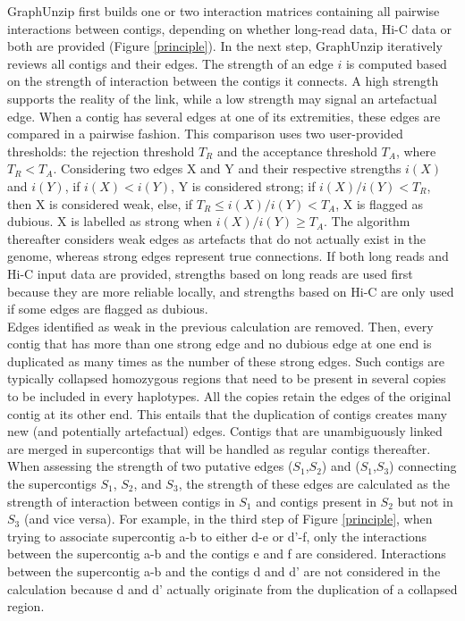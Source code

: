 GraphUnzip first builds one or two interaction matrices containing all pairwise interactions between contigs, depending on whether long-read data, Hi-C data or both are provided (Figure \ref{principle}).
In the next step, GraphUnzip iteratively reviews all contigs and their edges. The strength of an edge  $i$ is computed based on the strength of interaction between the contigs it connects. A high strength supports the reality of the link, while a low strength may signal an artefactual edge. When a contig has several edges at one of its extremities, these edges are compared in a pairwise fashion. This comparison uses two user-provided thresholds: the rejection threshold $T_R$ and the acceptance threshold $T_A$, where $T_R < T_A$. Considering two edges X and Y and their respective strengths $i(X)$ and $i(Y)$, if $i(X) < i(Y)$, Y is considered strong; if $i(X)/i(Y) < T_R$, then X is considered weak, else, if $T_R \le i(X)/i(Y) < T_A$, X is flagged as dubious. X is labelled as strong when $i(X)/i(Y) \ge T_A$. The algorithm thereafter considers weak edges as artefacts that do not actually exist in the genome, whereas strong edges represent true connections. If both long reads and Hi-C input data are provided, strengths based on long reads are used first because they are more reliable locally, and strengths based on Hi-C are only used if some edges are flagged as dubious. \\

Edges identified as weak in the previous calculation are removed. Then, every contig that has more than one strong edge and no dubious edge at one end is duplicated as many times as the number of these strong edges. Such contigs are typically collapsed homozygous regions that need to be present in several copies to be included in every haplotypes. All the copies retain the edges of the original contig at its other end. This entails that the duplication of contigs creates many new (and potentially artefactual) edges. Contigs that are unambiguously linked are merged in supercontigs that will be handled as regular contigs thereafter.\\

When assessing the strength of two putative edges ($S_1$,$S_2$) and ($S_1$,$S_3$) connecting the supercontigs $S_1$, $S_2$, and $S_3$, the strength of these edges are calculated as the strength of interaction between contigs in $S_1$ and contigs present in $S_2$ but not in $S_3$ (and vice versa). For example, in the third step of Figure \ref{principle}, when trying to associate supercontig a-b to either d-e or d'-f, only the interactions between the supercontig a-b and the contigs e and f are considered. Interactions between the supercontig a-b and the contigs d and d' are not considered in the calculation because d and d' actually originate from the duplication of a collapsed region. \\

